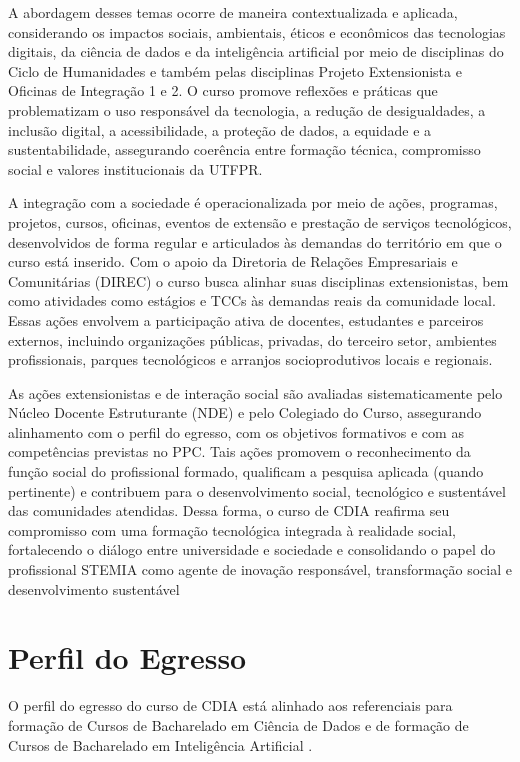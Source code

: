 A abordagem desses temas ocorre de maneira contextualizada e aplicada, considerando os impactos sociais, ambientais, éticos e econômicos das tecnologias digitais, da ciência de dados e da inteligência artificial por meio de disciplinas do Ciclo de Humanidades e também pelas disciplinas Projeto Extensionista e Oficinas de Integração 1 e 2. O curso promove reflexões e práticas que problematizam o uso responsável da tecnologia, a redução de desigualdades, a inclusão digital, a acessibilidade, a proteção de dados, a equidade e a sustentabilidade, assegurando coerência entre formação técnica, compromisso social e valores institucionais da UTFPR.

A integração com a sociedade é operacionalizada por meio de ações, programas, projetos, cursos, oficinas, eventos de extensão e prestação de serviços tecnológicos, desenvolvidos de forma regular e articulados às demandas do território em que o curso está inserido. Com o apoio da Diretoria de Relações Empresariais e Comunitárias (DIREC) o curso busca alinhar suas disciplinas extensionistas, bem como atividades como estágios e TCCs às demandas reais da comunidade local. Essas ações envolvem a participação ativa de docentes, estudantes e parceiros externos, incluindo organizações públicas, privadas, do terceiro setor, ambientes profissionais, parques tecnológicos e arranjos socioprodutivos locais e regionais.

As ações extensionistas e de interação social são avaliadas sistematicamente pelo Núcleo Docente Estruturante (NDE) e pelo Colegiado do Curso, assegurando alinhamento com o perfil do egresso, com os objetivos formativos e com as competências previstas no PPC. Tais ações promovem o reconhecimento da função social do profissional formado, qualificam a pesquisa aplicada (quando pertinente) e contribuem para o desenvolvimento social, tecnológico e sustentável das comunidades atendidas.
Dessa forma, o curso de CDIA reafirma seu compromisso com uma formação tecnológica integrada à realidade social, fortalecendo o diálogo entre universidade e sociedade e consolidando o papel do profissional STEMIA como agente de inovação responsável, transformação social e desenvolvimento sustentável

\section{Perfil do Egresso}

O perfil do egresso do curso de CDIA está alinhado aos referenciais para formação de Cursos de Bacharelado em Ciência de Dados \cite{SBC_REF_CD_2023} e de formação de Cursos de Bacharelado em Inteligência Artificial \cite{SBC_REF_IA_2024}.

